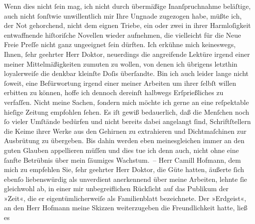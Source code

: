 \begin{ledgroupsized}[t]{13cm}
                    Wenn dies nicht ſein mag, ich nicht durch übermäßige Inanſpruchnahme beläſtige,
                    auch nicht {\pb}ſonſtwie unwillentlich mir Ihre Ungnade
                    zugezogen habe, müßte ich, der Not gehorchend, nicht dem eignen Triebe, ein oder
                    zwei in ihrer Harmloſigkeit entwaffnende hiſtoriſche Novellen wieder aufnehmen,
                    die vielleicht für die Neue Freie Preſſe nicht
                    ganz ungeeignet ſein dürften. Ich erkühne mich keineswegs, Ihnen, ſehr geehrter
                    Herr Doktor, neuerdings die angreifende Lektüre irgend einer meiner
                    Mittelmäßigkeiten zumuten zu wollen, von denen ich übrigens letzthin
                    loyalerweiſe die denkbar kleinſte Doſis überſandte. Bin ich auch leider lange
                    nicht ſoweit, eine Befürwortung irgend einer meiner Arbeiten um ihrer ſelbſt
                    willen erbitten zu können, hoffe ich dennoch dereinſt halbwegs Erſprießliches zu
                    verfaſſen. Nicht meine Sachen, {\pb}ſondern mich möchte ich
                    gerne an eine reſpektable hieſige Zeitung empfohlen ſehen. Es iſt gewiß
                    bedauerlich, daß die Menſchen noch ſo vieler Umſtände bedürfen und nicht bereits
                    dabei angelangt ſind, Schriftſtellern die Keime ihrer Werke aus den Gehirnen zu
                    extrahieren und Dichtmaſchinen zur Ausbrütung zu übergeben. Bis dahin werden
                    eben meinesgleichen immer an den guten Glauben appellieren müſſen und dies tue
                    ich denn auch, nicht ohne eine ſanfte Betrübnis über mein ſäumiges Wachstum. –
                    Herr Camill Hofmann, dem mich zu empfehlen
                    Sie, ſehr geehrter Herr Doktor, die Güte hatten, äußerte ſich ebenſo
                    liebenswürdig als unverdient anerkennend über meine Arbeiten, lehnte ſie
                    gleichwohl ab, in einer {\pb}mir unbegreiflichen Rückſicht
                    auf das Publikum der »Zeit«, die er
                    eigentümlicherweiſe als Familienblatt bezeichnete. Der »Erdgeist«, an den Herr Hofmann meine Skizzen weiterzugeben die Freundlichkeit hatte, ließ es

\end{ledgroupsized}
